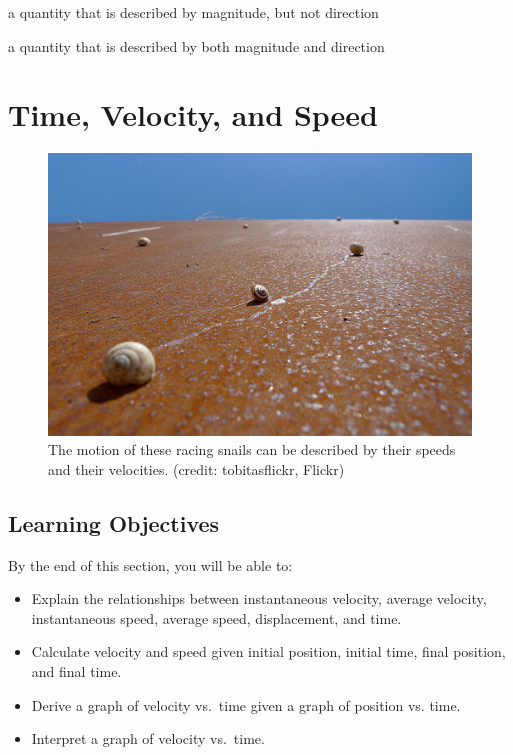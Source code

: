 \documentclass[
]{book}
\providecommand{\tightlist}{%
  \setlength{\itemsep}{0pt}\setlength{\parskip}{0pt}}
\begin{document}
\begin{description}
\tightlist
\item[scalar]
a quantity that is described by magnitude, but not direction
\end{description}

\begin{description}
\tightlist
\item[vector]
a quantity that is described by both magnitude and direction
\end{description}

\hypertarget{time-velocity-and-speed}{%
\section{Time, Velocity, and Speed}\label{time-velocity-and-speed}}

\begin{figure}
\hypertarget{import-auto-id1690049}{%
\centering
\includegraphics{images/Picture 6.png}
\caption{The motion of these racing snails can be described by their speeds and
their velocities. (credit: tobitasflickr,
Flickr)}\label{import-auto-id1690049}
}
\end{figure}

\hypertarget{fs-id1037368}{}
\hypertarget{learning-objectives-1}{%
\subsection{Learning Objectives}\label{learning-objectives-1}}

By the end of this section, you will be able to:

\begin{itemize}
\tightlist
\item
  Explain the relationships between instantaneous velocity, average
  velocity, instantaneous speed, average speed, displacement, and
  time.
\item
  Calculate velocity and speed given initial position, initial time,
  final position, and final time.
\item
  Derive a graph of velocity vs.~time given a graph of position vs.
  time.
\item
  Interpret a graph of velocity vs.~time.
\end{itemize}
\end{document}
